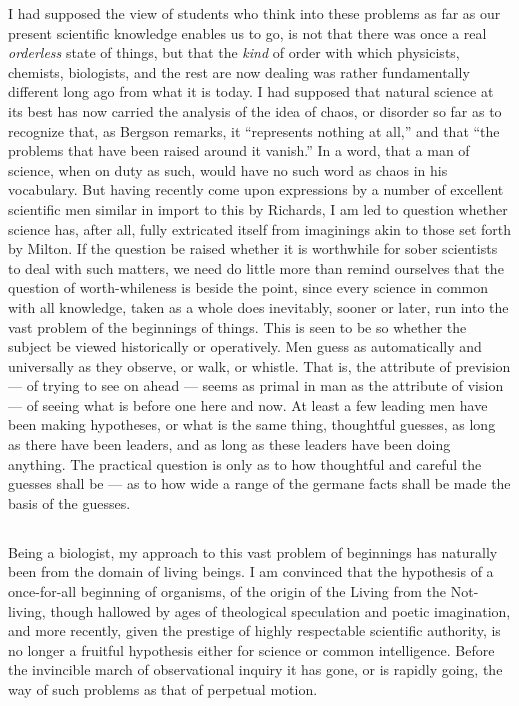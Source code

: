 \documentclass[a4paper, 11pt, oneside, polutonikogreek, english]{article}
\begin{document}
I had supposed the view of students who think into these problems as far as our present scientific knowledge enables us to go, is not that there was once a real \emph{orderless} state of things, but that the \emph{kind} of order with which physicists, chemists, biologists, and the rest are now dealing was rather fundamentally different long ago from what it is today. I had supposed that natural science at its best has now carried the analysis of the idea of chaos, or disorder so far as to recognize that, as Bergson remarks, it ``represents nothing at all,'' and that ``the problems that have been raised around it vanish.'' In a word, that a man of science, when on duty as such, would have no such word as chaos in his vocabulary. But having recently come upon expressions by a number of excellent scientific men similar in import to this by Richards, I am led to question whether science has, after all, fully extricated itself from imaginings akin to those set forth by Milton. If the question be raised whether it is worthwhile for sober scientists to deal with such matters, we need do little more than remind ourselves that the question of worth-whileness is beside the point, since every science in common with all knowledge, taken as a whole does inevitably, sooner or later, run into the vast problem of the beginnings of things. This is seen to be so whether the subject be viewed historically or operatively. Men guess as automatically and universally as they observe, or walk, or whistle. That is, the attribute of prevision --- of trying to see on ahead --- seems as primal in man as the attribute of vision --- of seeing what is before one here and now. At least a few leading men have been making hypotheses, or what is the same thing, thoughtful guesses, as long as there have been leaders, and as long as these leaders have been doing anything. The practical question is only as to how thoughtful and careful the guesses shall be --- as to how wide a range of the germane facts shall be made the basis of the guesses.

\subsection{}
\paragraph{}
Being a biologist, my approach to this vast problem of beginnings has naturally been from the domain of living beings. I am convinced that the hypothesis of a once-for-all beginning of organisms, of the origin of the Living from the Not-living, though hallowed by ages of theological speculation and poetic imagination, and more recently, given the prestige of highly respectable scientific authority, is no longer a fruitful hypothesis either for science or common intelligence. Before the invincible march of observational inquiry it has gone, or is rapidly going, the way of such problems as that of perpetual motion.
\end{document}
